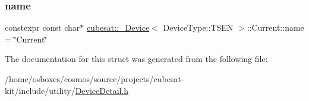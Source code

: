 \subsubsection{\texorpdfstring{name}{name}}
{\footnotesize\ttfamily constexpr const char$\ast$ \hyperlink{structcubesat_1_1__Device}{cubesat\+::\+\_\+\+Device}$<$ Device\+Type\+::\+T\+S\+EN $>$\+::Current\+::name = \char`\"{}Current\char`\"{}\hspace{0.3cm}{\ttfamily [static]}}



The documentation for this struct was generated from the following file\+:\begin{DoxyCompactItemize}
\item 
/home/osboxes/cosmos/source/projects/cubesat-\/kit/include/utility/\hyperlink{DeviceDetail_8h}{Device\+Detail.\+h}\end{DoxyCompactItemize}
